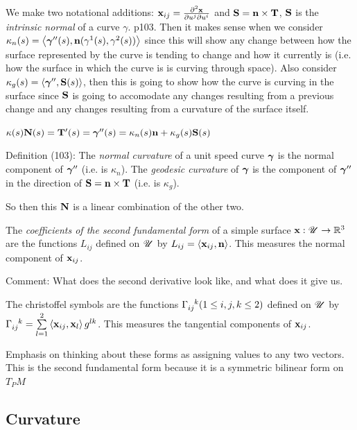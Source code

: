 We make two notational additions: $\mathbf{x}_{ij} = \frac{\partial^2\mathbf{x}}{\partial u^j \partial u^i}$ and $\mathbf{S} = \mathbf{n} \times \mathbf{T}$, $\mathbf{S}$ is the \emph{intrinsic normal} of a curve $\gamma$. p103. Then it makes sense when we consider $\kappa_n(s) = \left\langle\boldsymbol{\gamma}^{\prime\prime}(s), \mathbf{n}(\gamma^1(s), \gamma^2(s))\right\rangle$ since this will show any change between how the surface represented by the curve is tending to change and how it currently is (i.e. how the surface in which the curve is is curving through space). Also consider $\kappa_g(s) = \left\langle\boldsymbol{\gamma}^{\prime\prime}, \mathbf{S}(s)\right\rangle$, then this is going to show how the curve is curving in the surface since $\mathbf{S}$ is going to accomodate any changes resulting from a previous change and any changes resulting from a curvature of the surface itself.

$\kappa(s)\mathbf{N}(s) = \mathbf{T}^\prime(s) = \boldsymbol{\gamma}^{\prime\prime}(s) = \kappa_n(s)\mathbf{n} + \kappa_g(s)\mathbf{S}(s)$

Definition (103): The \emph{normal curvature} of a unit speed curve $\boldsymbol{\gamma}$ is the normal component of $\boldsymbol{\gamma}^{\prime\prime}$ (i.e. is $\kappa_n$). The \emph{geodesic curvature} of $\boldsymbol{\gamma}$ is the component of $\boldsymbol{\gamma}^{\prime\prime}$ in the direction of $\mathbf{S} = \mathbf{n} \times \mathbf{T}$ (i.e. is $\kappa_g$).

So then this $\mathbf{N}$ is a linear combination of the other two.

The \emph{coefficients of the second fundamental form} of a simple surface $\mathbf{x}: \mathscr{U} \to \mathbb{R}^3$ are the functions $L_{ij}$ defined on $\mathscr{U}$ by $L_{ij} = \left\langle\mathbf{x}_{ij}, \mathbf{n}\right\rangle$. This measures the normal component of $\mathbf{x}_{ij}$.

Comment: What does the second derivative look like, and what does it give us.

The christoffel symbols are the functions $\Cfl (1 \le i, j, k \le 2)$ defined on $\mathscr{U}$ by $\Cfl = \sum\limits_{l = 1}^2 \left\la \bx_{ij}, \bx_{l}\right\ra g^{lk}$. This measures the tangential components of $\mathbf{x}_{ij}$.

Emphasis on thinking about these forms as assigning values to any two vectors. This is the second fundamental form because it is a symmetric bilinear form on $T_P M$



\subsection{Curvature}

